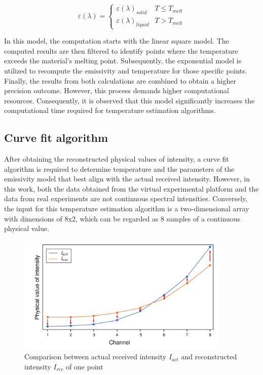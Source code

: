 \begin{equation}
  \label{eq: emi_mix_gen}
  \varepsilon(\lambda) = \begin{cases} 
    \varepsilon(\lambda)_{solid} &  T \leq T_{melt} \\
    \varepsilon(\lambda)_{liquid} & T > T_{melt}
  \end{cases}
\end{equation}


In this model, the computation starts with the linear square model. The computed 
results are then filtered to identify points where the temperature exceeds 
the material's melting point. Subsequently, the exponential model is 
utilized to recompute the emissivity and temperature for those specific points. 
Finally, the results from both calculations are combined to obtain a higher 
precision outcome. However, this process demands higher computational resources. 
Consequently, it is observed that this model significantly increases the 
computational time required for temperature estimation algorithms.


\subsection{Curve fit algorithm}
After obtaining the reconstructed physical values of intensity, 
a curve fit algorithm is required to determine  
temperature and the parameters of the emissivity model that best 
align with the actual received intensity. However, in this work, both 
the data obtained from the virtual experimental platform and the data 
from real experiments are not continuous spectral intensities. 
Conversely, the input for this temperature estimation algorithm is a 
two-dimensional array with dimensions of 8x2, which can be regarded as 8 
samples of a continuous physical value.


\begin{figure}[htbp]
  \centering
  \includegraphics[width=0.9\textwidth]{figures/curve_fit.pdf}
  \caption{Comparison between actual received intensity $I_{act}$ 
  and reconstructed intensity $I_{rec}$ of one point}
  \label{fig: curve_fit_demo}
\end{figure}


